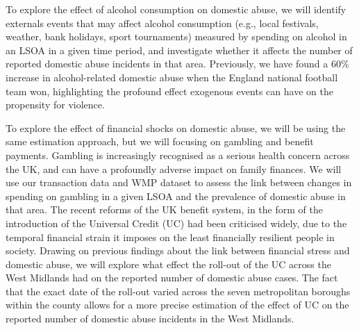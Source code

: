 \documentclass[11pt, a4paper]{article}
\begin{document}
To explore the effect of alcohol consumption on domestic abuse, we will identify externals events that may affect alcohol consumption (e.g., local festivals, weather, bank holidays, sport tournaments) measured by spending on alcohol in an LSOA in a given time period, and investigate whether it affects the number of reported domestic abuse incidents in that area. Previously, we have found a 60\% increase in alcohol-related domestic abuse when the England national football team won, highlighting the profound effect exogenous events can have on the propensity for violence. 

To explore the effect of financial shocks on domestic abuse, we will be using the same estimation approach, but we will focusing on gambling and benefit payments. Gambling is increasingly recognised as a serious health concern across the UK, and can have a profoundly adverse impact on family finances. We will use our transaction data and WMP dataset to assess the link between changes in spending on gambling in a given LSOA and the prevalence of domestic abuse in that area. The recent reforms of the UK benefit system, in the form of the introduction of the Universal Credit (UC) had been criticised widely, due to the temporal financial strain it imposes on the least financially resilient people in society. Drawing on previous findings about the link between financial stress and domestic abuse, we will explore what effect the roll-out of the UC across the West Midlands had on the reported number of domestic abuse cases. The fact that the exact date of the roll-out varied across the seven metropolitan boroughs within the county allows for a more precise estimation of the effect of UC on the reported number of domestic abuse incidents in the West Midlands.
 
\end{document}
